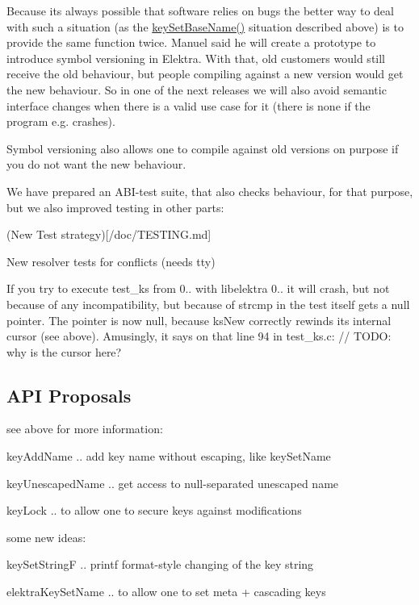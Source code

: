 Because its always possible that software relies on bugs the better way to deal with such a situation (as the \hyperlink{group__keyname_ga6e804bd453f98c28b0ff51430d1df407}{key\+Set\+Base\+Name()} situation described above) is to provide the same function twice. Manuel said he will create a prototype to introduce symbol versioning in Elektra. With that, old customers would still receive the old behaviour, but people compiling against a new version would get the new behaviour. So in one of the next releases we will also avoid semantic interface changes when there is a valid use case for it (there is none if the program e.\+g. crashes).

Symbol versioning also allows one to compile against old versions on purpose if you do not want the new behaviour.

We have prepared an A\+B\+I-\/test suite, that also checks behaviour, for that purpose, but we also improved testing in other parts\+:
\begin{DoxyItemize}
\item (New Test strategy)\mbox{[}/doc/\+T\+E\+S\+T\+I\+N\+G.md\mbox{]}
\item New resolver tests for conflicts (needs tty)
\end{DoxyItemize}

If you try to execute test\+\_\+ks from 0.. with libelektra 0.. it will crash, but not because of any incompatibility, but because of strcmp in the test itself gets a null pointer. The pointer is now null, because ks\+New correctly rewinds its internal cursor (see above). Amusingly, it says on that line 94 in test\+\_\+ks.\+c\+: // T\+O\+D\+O\+: why is the cursor here?

\subsection*{A\+P\+I Proposals}

see above for more information\+:
\begin{DoxyItemize}
\item key\+Add\+Name .. add key name without escaping, like key\+Set\+Name
\item key\+Unescaped\+Name .. get access to null-\/separated unescaped name
\item key\+Lock .. to allow one to secure keys against modifications
\end{DoxyItemize}

some new ideas\+:
\begin{DoxyItemize}
\item key\+Set\+String\+F .. printf format-\/style changing of the key string
\item elektra\+Key\+Set\+Name .. to allow one to set meta + cascading keys
\end{DoxyItemize}

